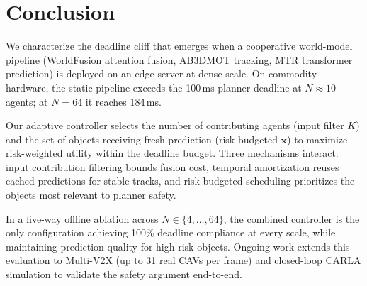 \section{Conclusion}
\label{sec:conclusion}

We characterize the deadline cliff that emerges when a cooperative
world-model pipeline (WorldFusion attention fusion, AB3DMOT tracking,
MTR transformer prediction) is deployed on an edge server at dense
scale.  On commodity hardware, the static pipeline exceeds the 100\,ms
planner deadline at $N \approx 10$ agents; at $N{=}64$ it reaches
184\,ms.

Our adaptive controller selects the number of contributing agents
(input filter $K$) and the set of objects receiving fresh prediction
(risk-budgeted $\mathbf{x}$) to maximize risk-weighted utility within
the deadline budget.  Three mechanisms interact: input contribution
filtering bounds fusion cost, temporal amortization reuses cached
predictions for stable tracks, and risk-budgeted scheduling
prioritizes the objects most relevant to planner safety.

In a five-way offline ablation across $N \in \{4, \ldots, 64\}$,
the combined controller is the only configuration achieving 100\%
deadline compliance at every scale, while maintaining prediction
quality for high-risk objects.  Ongoing work extends this evaluation
to Multi-V2X (up to 31 real CAVs per frame) and closed-loop CARLA
simulation to validate the safety argument end-to-end.
